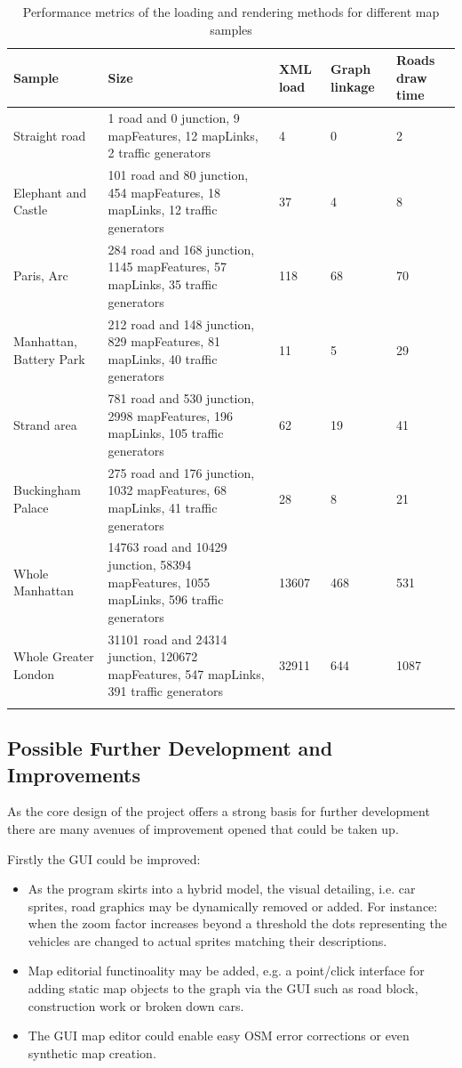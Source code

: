 \begin{center}
\begin{longtabu} to \textwidth {|
    X[2,l]|
    X[4,l]|
    X[3,c]|
    X[3,c]|
    X[3,c]|
    }
    \hline
    \textbf{Sample} & \textbf{Size} & \textbf{XML load} & \textbf{Graph linkage} & \textbf{Roads draw time} \\ \hline
Straight road & 1 road and 0 junction, 9 mapFeatures, 12 mapLinks, 2 traffic generators & 4 & 0 & 2 \\ \hline
Elephant and Castle & 101 road and 80 junction, 454 mapFeatures, 18 mapLinks, 12 traffic generators & 37 & 4 & 8 \\ \hline
Paris, Arc & 284 road and 168 junction, 1145 mapFeatures, 57 mapLinks, 35 traffic generators & 118 & 68 & 70 \\ \hline
Manhattan, Battery Park & 212 road and 148 junction, 829 mapFeatures, 81 mapLinks, 40 traffic generators & 11 & 5 & 29 \\ \hline
Strand area & 781 road and 530 junction, 2998 mapFeatures, 196 mapLinks, 105 traffic generators & 62 & 19 & 41 \\ \hline
Buckingham Palace& 275 road and 176 junction, 1032 mapFeatures, 68 mapLinks, 41 traffic generators & 28 & 8 & 21 \\ \hline
Whole Manhattan & 14763 road and 10429 junction, 58394 mapFeatures, 1055 mapLinks, 596 traffic generators & 13607 & 468 & 531 \\ \hline
Whole Greater London & 31101 road and 24314 junction, 120672 mapFeatures, 547 mapLinks, 391 traffic generators & 32911 & 644 & 1087 \\ \hline

\caption{Performance metrics of the loading and rendering methods for different map samples}
\label{table:performanceComparison}
\end{longtabu}
\end{center}


\subsection{Possible Further Development and Improvements}

As the core design of the project offers a strong basis for further development there are many avenues of improvement opened that could be taken up.

Firstly the GUI could be improved:

\begin{itemize}
	\item As the program skirts into a hybrid model, the visual detailing, i.e. car sprites, road graphics may be dynamically removed or added. For instance: when the zoom factor increases beyond a threshold the dots representing the vehicles are changed to actual sprites matching their descriptions.
	\item Map editorial functinoality may be added, e.g. a point/click interface for adding static map objects to the graph via the GUI such as road block, construction work or broken down cars.
	\item The GUI map editor could enable easy OSM error corrections or even synthetic map creation.
\end{itemize}

